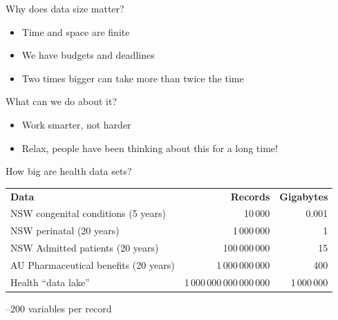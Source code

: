 \documentclass[aspectratio=169,12pt,usepdftitle=false]{beamer} %
\begin{document}
\begin{frame}{Why does data size matter?}
    \begin{itemize}
        \item Time and space are finite
	\item We have budgets and deadlines
	\item Two times bigger can take more than twice the time
    \end{itemize}
\end{frame}


\begin{frame}{What can we do about it?}
    \begin{itemize}
	\item Work smarter, not harder
	\item Relax, people have been thinking about this for a long time!
    \end{itemize}
\end{frame}

{
\begin{frame}[plain]
\end{frame}
}


\begin{frame}{How big are health data sets?}
    \begin{tabular}{lrr}
	\textbf{Data} & \textbf{Records} & \textbf{Gigabytes} \\
	NSW congenital conditions (5 years)& 10\,000 & 0.001 \\
	NSW perinatal (20 years) & 1\,000\,000 & 1 \\
	NSW Admitted patients (20 years) & 100\,000\,000 & 15 \\
	AU Pharmaceutical benefits (20 years) & 1\,000\,000\,000 & 400 \\
	Health ``data lake'' & 1\,000\,000\,000\,000\,000 & 1\,000\,000 \\
    \end{tabular}\par
    --200 variables per record
\end{frame}
\end{document}
